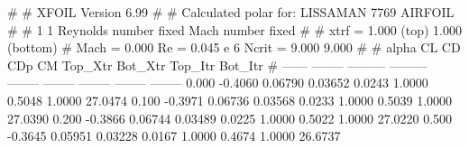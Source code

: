 #  
#       XFOIL         Version 6.99
#  
# Calculated polar for: LISSAMAN 7769 AIRFOIL                           
#  
# 1 1 Reynolds number fixed          Mach number fixed         
#  
# xtrf =   1.000 (top)        1.000 (bottom)  
# Mach =   0.000     Re =     0.045 e 6     Ncrit =   9.000  9.000
#  
#   alpha    CL        CD       CDp       CM     Top_Xtr  Bot_Xtr  Top_Itr  Bot_Itr
#  ------ -------- --------- --------- -------- -------- -------- -------- --------
   0.000  -0.4060   0.06790   0.03652   0.0243   1.0000   0.5048   1.0000  27.0474
   0.100  -0.3971   0.06736   0.03568   0.0233   1.0000   0.5039   1.0000  27.0390
   0.200  -0.3866   0.06744   0.03489   0.0225   1.0000   0.5022   1.0000  27.0220
   0.500  -0.3645   0.05951   0.03228   0.0167   1.0000   0.4674   1.0000  26.6737
